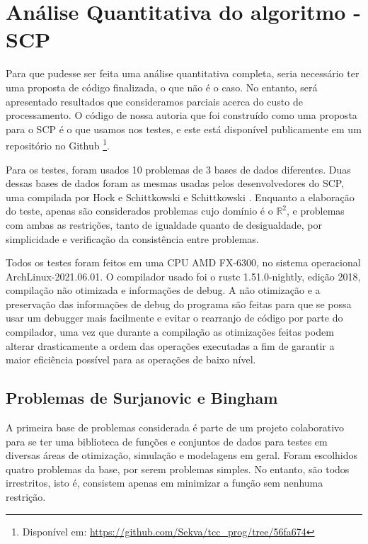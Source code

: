\section{Análise Quantitativa do algoritmo - SCP}

\noindent
Para que pudesse ser feita uma análise quantitativa completa, seria necessário ter uma
proposta de código finalizada, o que não é o caso. No entanto, será apresentado
resultados que consideramos parciais acerca do custo de processamento.
O código de nossa autoria que foi construído como uma proposta para o SCP é
o que usamos nos testes, e este está disponível publicamente em um repositório no Github
\footnote{Disponível em: \url{https://github.com/Sekva/tcc_prog/tree/56fa674}}.

Para os testes, foram usados 10 problemas de 3 bases de dados diferentes.
Duas dessas bases de dados foram as mesmas usadas pelos desenvolvedores do
SCP, uma compilada por Hock e Schittkowski \cite{Hock1981}
e Schittkowski \cite{Schittkowski1987}. Enquanto a elaboração do teste, apenas são
considerados problemas cujo domínio é o \(\mathbb{R}^2\), e problemas com ambas as
restrições, tanto de igualdade quanto de desigualdade, por simplicidade e
verificação da consistência entre problemas.

Todos os testes foram feitos em uma CPU AMD FX-6300, no sistema operacional
ArchLinux-2021.06.01. O compilador usado foi o rustc 1.51.0-nightly, edição 2018,
compilação não otimizada e informações de debug. A não otimização e a preservação
das informações de debug do programa são feitas para que se possa usar um debugger
mais facilmente e evitar o rearranjo de código por parte do compilador, uma vez
que durante a compilação as otimizações feitas podem alterar drasticamente a
ordem das operações executadas a fim de garantir a maior eficiência possível
para as operações de baixo nível.

\subsection{Problemas de Surjanovic e Bingham}

\noindent
A primeira base de problemas considerada \cite{sfuca} é parte de um projeto colaborativo
para se ter uma biblioteca de funções e conjuntos de dados para testes em diversas
áreas de otimização, simulação e modelagens em geral. Foram escolhidos quatro
problemas da base, por serem problemas simples. No entanto, são todos irrestritos,
isto é, consistem apenas em minimizar a função sem nenhuma restrição.

